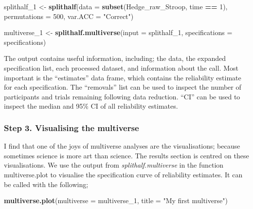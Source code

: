 \documentclass[
  english,
  man,floatsintext]{apa6}
\newenvironment{Shaded}{\begin{snugshade}}{\end{snugshade}}
\newcommand{\DataTypeTok}[1]{\textcolor[rgb]{0.13,0.29,0.53}{#1}}
\newcommand{\DecValTok}[1]{\textcolor[rgb]{0.00,0.00,0.81}{#1}}
\newcommand{\KeywordTok}[1]{\textcolor[rgb]{0.13,0.29,0.53}{\textbf{#1}}}
\newcommand{\NormalTok}[1]{#1}
\newcommand{\OperatorTok}[1]{\textcolor[rgb]{0.81,0.36,0.00}{\textbf{#1}}}
\newcommand{\StringTok}[1]{\textcolor[rgb]{0.31,0.60,0.02}{#1}}
\begin{document}
\begin{Shaded}
\begin{Highlighting}[]
\NormalTok{splithalf_}\DecValTok{1}\NormalTok{ <-}\StringTok{ }\KeywordTok{splithalf}\NormalTok{(}\DataTypeTok{data =} \KeywordTok{subset}\NormalTok{(Hedge_raw_Stroop, time }\OperatorTok{==}\StringTok{ }\DecValTok{1}\NormalTok{),}
                         \DataTypeTok{permutations =} \DecValTok{500}\NormalTok{,}
                         \DataTypeTok{var.ACC =} \StringTok{"Correct"}\NormalTok{)}

\NormalTok{multiverse_}\DecValTok{1}\NormalTok{ <-}\StringTok{ }\KeywordTok{splithalf.multiverse}\NormalTok{(}\DataTypeTok{input =}\NormalTok{ splithalf_}\DecValTok{1}\NormalTok{,}
                 \DataTypeTok{specifications =}\NormalTok{ specifications)}
\end{Highlighting}
\end{Shaded}

The output contains useful information, including; the data, the expanded specification list, each processed dataset, and information about the call. Most important is the \enquote{estimates} data frame, which contains the reliability estimate for each specification. The \enquote{removals} list can be used to inspect the number of participants and trials remaining following data reduction. \enquote{CI} can be used to inspect the median and 95\% CI of all reliability estimates.

\hypertarget{step-3.-visualising-the-multiverse}{%
\subsubsection{Step 3. Visualising the multiverse}\label{step-3.-visualising-the-multiverse}}

I find that one of the joys of multiverse analyses are the visualisations; because sometimes science is more art than science. The results section is centred on these visualisations. We use the output from \emph{splithalf.multiverse} in the function multiverse.plot to visualise the specification curve of reliability estimates. It can be called with the following;

\begin{Shaded}
\begin{Highlighting}[]
\KeywordTok{multiverse.plot}\NormalTok{(}\DataTypeTok{multiverse =}\NormalTok{ multiverse_}\DecValTok{1}\NormalTok{,}
         \DataTypeTok{title =} \StringTok{"My first multiverse"}\NormalTok{)}
\end{Highlighting}
\end{Shaded}
\end{document}
